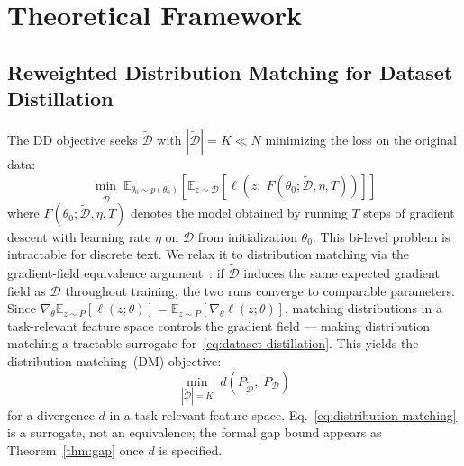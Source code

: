 \documentclass[12pt, a4paper, twoside]{book}
\numberwithin{equation}{chapter}
\theoremstyle{plain}
\theoremstyle{definition}
\theoremstyle{remark}
\newenvironment{foldable}{}{}
\begin{document}
 \section{Theoretical Framework} \label{sec:52-research03-theory}

\subsection{Reweighted Distribution Matching for Dataset Distillation} \label{sec:52-research03-theory-rdm}
\begin{foldable} The \acl{DD} objective seeks $\tilde{\mathcal{D}}$ with $|\tilde{\mathcal{D}}| = K \ll N$ minimizing the loss on the original data:
    \begin{equation}
        \min_{\tilde{\mathcal{D}}}\; \mathbb{E}_{\theta_0 \sim p(\theta_0)} \left[ \mathbb{E}_{z \sim \mathcal{D}} \left[ \ell\!\left(z;\; F(\theta_0; \tilde{\mathcal{D}}, \eta, T)\right) \right] \right]
        \label{eq:dataset-distillation}
    \end{equation}
    where $F(\theta_0; \tilde{\mathcal{D}}, \eta, T)$ denotes the model obtained by running $T$ steps of gradient descent with learning rate $\eta$ on $\tilde{\mathcal{D}}$ from initialization $\theta_0$.
    This bi-level problem is intractable for discrete text.
    We relax it to distribution matching via the gradient-field equivalence argument~\cite{zhao2023dataset}: if $\tilde{\mathcal{D}}$ induces the same expected gradient field as $\mathcal{D}$ throughout training, the two runs converge to comparable parameters.
    Since $\nabla_\theta \mathbb{E}_{z \sim P}[\ell(z;\theta)] = \mathbb{E}_{z \sim P}[\nabla_\theta \ell(z;\theta)]$, matching distributions in a task-relevant feature space controls the gradient field --- making distribution matching a tractable surrogate for~\eqref{eq:dataset-distillation}.
    This yields the distribution matching~(DM) objective:
    \begin{equation}
        \min_{|\tilde{\mathcal{D}}| = K}\; d\!\left(P_{\tilde{\mathcal{D}}},\; P_{\mathcal{D}}\right)
        \label{eq:distribution-matching}
    \end{equation}
    for a divergence $d$ in a task-relevant feature space.
    Eq.~\eqref{eq:distribution-matching} is a surrogate, not an equivalence; the formal gap bound appears as Theorem~\ref{thm:gap} once $d$ is specified.
\end{foldable}
\end{document}
